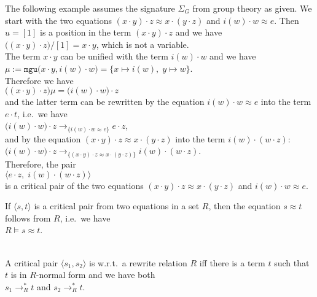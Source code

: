 \example
The following example assumes the signature $\Sigma_G$ from group theory as given.
We start with the two equations $(x \cdot y) \cdot z \approx x \cdot (y \cdot z)$ and $i(w) \cdot w \approx e$.
Then $u = [1]$ is a position in the term $(x \cdot y) \cdot z$ and we have
\\[0.2cm]
\hspace*{1.3cm}
$\bigl((x \cdot y) \cdot z\bigr)/[1] = x \cdot y$, which is not a variable.
\\[0.2cm]
The term $x \cdot y$ can be unified with the term $i(w) \cdot w$ and we have
\\[0.2cm]
\hspace*{1.3cm}
$\mu := \texttt{mgu}\bigl(x \cdot y, i(w) \cdot w\bigr) = \{ x \mapsto i(w),\; y \mapsto w \}$.
\\[0.2cm]
Therefore we have
\\[0.2cm]
\hspace*{1.3cm}
$\bigl((x \cdot y) \cdot z\bigr)\mu = \bigl(i(w) \cdot w\bigr) \cdot z$
\\[0.2cm]
and the latter term can be rewritten by the equation $i(w) \cdot w \approx e$ into the term $e \cdot t$,
i.e.~we have
\\[0.2cm]
\hspace*{1.3cm}
$\bigl(i(w) \cdot w\bigr) \cdot z \rightarrow_{\{ i(w) \cdot w \approx e\}} e \cdot z$,
\\[0.2cm]
and by the equation $(x \cdot y) \cdot z \approx x \cdot (y \cdot z)$ into the term $i(w) \cdot (w \cdot z)$:
\\[0.2cm]
\hspace*{1.3cm}
$\bigl(i(w) \cdot w\bigr) \cdot z \rightarrow_{\{ (x \cdot y) \cdot z \approx x \cdot (y \cdot z)\}} i(w) \cdot (w \cdot z)$.
\\[0.2cm]
Therefore, the pair
\\[0.2cm]
\hspace*{1.3cm}
$\bigl\langle e \cdot z,\; i(w) \cdot (w \cdot z) \bigr\rangle$
\\[0.2cm]
is a critical pair of the two equations  $(x \cdot y) \cdot z \approx x \cdot (y \cdot z)$ and $i(w) \cdot w \approx e$.
\eox

\remark
If $\langle s, t\rangle$ is a critical pair from two equations in a set $R$, then the equation $s \approx t$
follows from $R$, i.e.~we have
\\[0.2cm]
\hspace*{1.3cm}
$R \models s \approx t$. \eox


\begin{Definition} \hspace*{\fill} \\
  A critical pair $\langle s_1, s_2\rangle$ is  w.r.t.~a rewrite relation $R$ iff there is a term
  $t$ such that $t$ is in $R$-normal form and we have both
  \\[0.2cm]
  \hspace*{1.3cm}
  $s_1 \rightarrow_R^* t$ \quad and \quad   $s_2 \rightarrow_R^* t$.  
\end{Definition}

